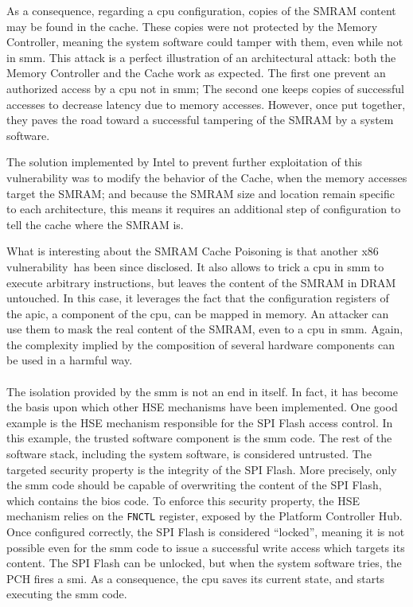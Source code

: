 As a consequence, regarding a \ac{cpu} configuration, copies of the SMRAM
content may be found in the cache.
%
These copies were not protected by the Memory Controller, meaning the system
software could tamper with them, even while not in \ac{smm}.
%
This attack is a perfect illustration of an architectural attack:
%
both the Memory Controller and the Cache work as expected.
%
The first one prevent an authorized access by a \ac{cpu} not in \ac{smm};
%
The second one keeps copies of successful accesses to decrease latency due to
memory accesses.
%
However, once put together, they paves the road toward a successful tampering of
the SMRAM by a system software.

The solution implemented by Intel to prevent further exploitation of this
vulnerability was to modify the behavior of the Cache, when the memory accesses
target the SMRAM;
%
and because the SMRAM size and location remain specific to each architecture,
this means it requires an additional step of configuration to tell the cache
where the SMRAM is.

What is interesting about the SMRAM Cache Poisoning is that another x86
vulnerability\,\cite{domas2015sinkhole} has been since disclosed.
%
It also allows to trick a \ac{cpu} in \ac{smm} to execute arbitrary
instructions, but leaves the content of the SMRAM in DRAM untouched.
%
In this case, it leverages the fact that the configuration registers of the
\ac{apic}, a component of the \ac{cpu}, can be mapped in memory.
%
An attacker can use them to mask the real content of the SMRAM, even to a
\ac{cpu} in \ac{smm}.
%
Again, the complexity implied by the composition of several hardware components
can be used in a harmful way.


\paragraph{}
%
The isolation provided by the \ac{smm} is not an end in itself.
%
In fact, it has become the basis upon which other HSE mechanisms have been
implemented.
%
One good example is the HSE mechanism responsible for the SPI Flash access
control.
%
In this example, the trusted software component is the \ac{smm} code.
%
The rest of the software stack, including the system software, is considered
untrusted.
%
The targeted security property is the integrity of the SPI Flash.
%
More precisely, only the \ac{smm} code should be capable of overwriting the
content of the SPI Flash, which contains the \ac{bios} code.
%
To enforce this security property, the HSE mechanism relies on the
\texttt{FNCTL}  register,
exposed by the Platform Controller Hub.
%
Once configured correctly, the SPI Flash is considered ``locked'', meaning it is
not possible even for the \ac{smm} code to issue a successful write access which
targets its content.
%
The SPI Flash can be unlocked, but when the system software tries, the PCH fires
a \ac{smi}.
%
As a consequence, the \ac{cpu} saves its current state, and starts executing the
\ac{smm} code.

